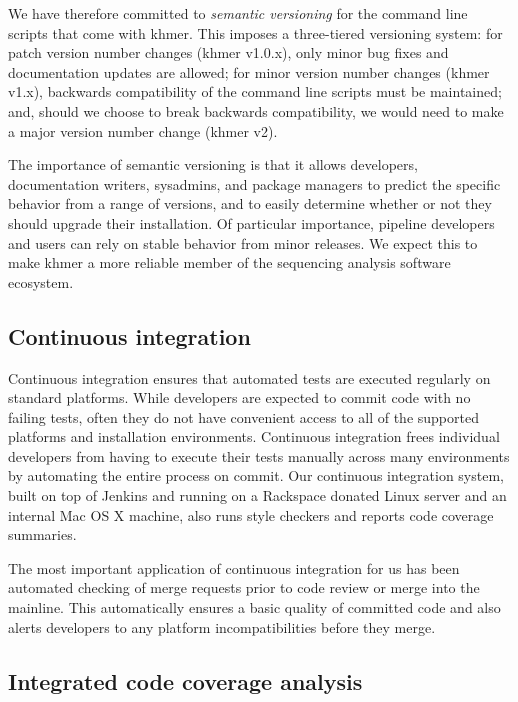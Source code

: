 \documentclass[11pt]{article}
\begin{document}
We have therefore committed to {\em semantic versioning}\cite{semver} for the
command line scripts that come with khmer.  This imposes a
three-tiered versioning system: for patch version number changes
(khmer v1.0.x), only minor bug fixes and documentation updates are
allowed; for minor version number changes (khmer v1.x), backwards
compatibility of the command line scripts must be maintained; and,
should we choose to break backwards compatibility, we would need to
make a major version number change (khmer v2).

The importance of semantic versioning is that it allows developers,
documentation writers, sysadmins, and package managers to predict the
specific behavior from a range of versions, and to easily determine
whether or not they should upgrade their installation.  Of particular
importance, pipeline developers and users can rely on stable behavior
from minor releases.  We expect this to make khmer a more reliable
member of the sequencing analysis software ecosystem.

\subsection{Continuous integration}

Continuous integration ensures that automated tests are executed
regularly on standard platforms.  While developers are expected to
commit code with no failing tests, often they do not have convenient
access to all of the supported platforms and installation
environments.  Continuous integration frees individual developers from
having to execute their tests manually across many environments by
automating the entire process on commit.  Our continuous integration
system, built on top of Jenkins and running on a Rackspace donated
Linux server and an internal Mac OS X machine, also runs style
checkers and reports code coverage summaries.

The most important application of continuous integration for us has
been automated checking of merge requests prior to code review or
merge into the mainline.  This automatically ensures a basic quality
of committed code and also alerts developers to any platform
incompatibilities before they merge.


\subsection{Integrated code coverage analysis}
\end{document}
